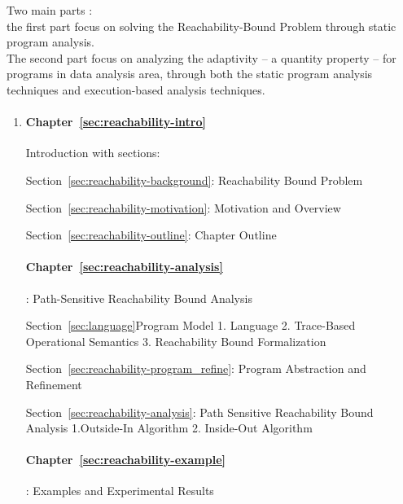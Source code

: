 Two main parts :
\\
the first part focus on solving the Reachability-Bound Problem through static program analysis.
\\
The second part focus on analyzing the adaptivity -- a quantity property -- for programs in data analysis area,
through both the  static program analysis techniques and execution-based analysis techniques.
\begin{enumerate}
    \item {}

        \paragraph{Chapter~\ref{sec:reachability-intro}} Introduction with sections:
        
        Section~\ref{sec:reachability-background}: {Reachability Bound Problem}
        
        Section~\ref{sec:reachability-motivation}: {Motivation and Overview}
        
        Section~\ref{sec:reachability-outline}: {Chapter Outline}

        \paragraph{Chapter~\ref{sec:reachability-analysis}}: {Path-Sensitive Reachability Bound Analysis}

        Section~{\ref{sec:language}}{{Program Model}}
        1. {Language}
        2. {Trace-Based Operational Semantics}
        3. {{Reachability Bound Formalization}}

        Section~\ref{sec:reachability-program_refine}: {Program Abstraction and Refinement}

        Section~\ref{sec:reachability-analysis}: {Path Sensitive Reachability Bound Analysis}
        1.{Outside-In Algorithm}
        2. {Inside-Out Algorithm}

        \paragraph{Chapter~{\ref{sec:reachability-example}}}: {Examples and Experimental Results}


\end{enumerate}
